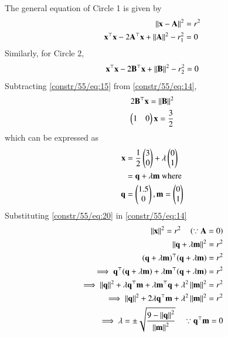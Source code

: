 The general equation of Circle 1 is given by 
\begin{align}
    \left\lVert\mathbf{x}-\mathbf{A}\right\rVert^2 &= r^2
    \\
\mathbf{x}^{\top}\mathbf{x} - 2\mathbf{A}^{\top}\mathbf{x} + \left\lVert\mathbf{A}\right\rVert^2 -r_{1}^2 &= 0\label{constr/55/eq:14}
\end{align}
Similarly, for Circle 2,
\begin{align}
\mathbf{x}^{\top}\mathbf{x} - 2\mathbf{B}^{\top}\mathbf{x} + \left\lVert\mathbf{B}\right\rVert^2 -r_{2}^2 = 0\label{constr/55/eq:15}
\end{align}
Subtracting \eqref{constr/55/eq:15} from \eqref{constr/55/eq:14},
\begin{align}
2\mathbf{B}^{\top}\mathbf{x}=\left\lVert\mathbf{B}\right\rVert^2
\\
\begin{pmatrix}1&0\end{pmatrix}\mathbf{x}=\frac{3}{2}
\end{align}
which can be expressed as
\begin{align}
\mathbf{x} &=\frac{1}{2}\begin{pmatrix}3\\ 0\end{pmatrix} + \lambda \begin{pmatrix}0\\1\end{pmatrix}\label{constr/55/eq:19}\\
&=\mathbf{q}+\lambda\mathbf{m} \text{ where}\label{constr/55/eq:20}\\
\mathbf{q}&=\begin{pmatrix}1.5\\ 0\end{pmatrix},
\mathbf{m}=\begin{pmatrix}0\\1\end{pmatrix}
\end{align}
Substituting \eqref{constr/55/eq:20} in \eqref{constr/55/eq:14}
\begin{align}
\left\lVert\mathbf{x}\right\rVert^2=r^2\quad \left(\because \mathbf{A}=0\right)
\\
\left\lVert\mathbf{q}+\lambda\mathbf{m}\right\rVert^2=r^2\\
(\mathbf{q}+\lambda \mathbf{m})^{\top}(\mathbf{q}+\lambda \mathbf{m})=r^2\\
\implies \mathbf{q}^{\top}(\mathbf{q}+\lambda \mathbf{m})+\lambda \mathbf{m}^{\top}(\mathbf{q}+\lambda \mathbf{m})=r^2
\\
\implies \left\lVert\mathbf{q}\right\rVert^2+\lambda\mathbf{q}^{\top}\mathbf{m}+\lambda\mathbf{m}^{\top}\mathbf{q}+\lambda^2\left\lVert\mathbf{m}\right\rVert^2=r^2
\\
\implies \left\lVert\mathbf{q}\right\rVert^2+2\lambda\mathbf{q}^{\top}\mathbf{m}+\lambda^2\left\lVert\mathbf{m}\right\rVert^2=r^2 
\\
\implies \lambda=\pm \sqrt{\frac{9-\left\lVert\mathbf{q}\right\rVert^2}{\left\lVert\mathbf{m}\right\rVert^2}} \quad \because \mathbf{q}^{\top}\mathbf{m} = 0
\end{align}
